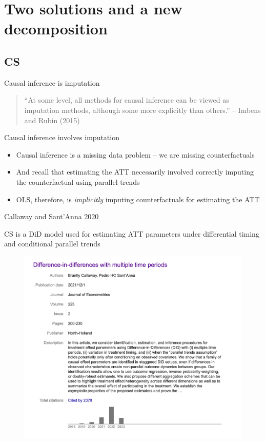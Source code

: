 \documentclass{beamer}
\begin{document}
\section{Two solutions and a new decomposition}

\subsection{CS}

\begin{frame}{Causal inference is imputation}

\begin{quote}
``At some level, all methods for causal inference can be viewed as imputation methods, although some more explicitly than others.'' -- Imbens and Rubin (2015)
\end{quote}

\end{frame}


\begin{frame}{Causal inference involves imputation}

\begin{itemize}
\item Causal inference is a missing data problem -- we are missing counterfactuals
\item And recall that estimating the ATT necessarily involved correctly imputing the counterfactual using parallel trends
\item OLS, therefore, is \emph{implicitly} imputing counterfactuals for estimating the ATT
\end{itemize}

\end{frame}


\begin{frame}{Callaway and Sant'Anna 2020}

CS is a DiD model used for estimating ATT parameters under differential timing and conditional parallel trends


\begin{figure}
\includegraphics[scale=0.25]{./lecture_includes/pedro_cites}
\end{figure}

\end{frame}
\end{document}

